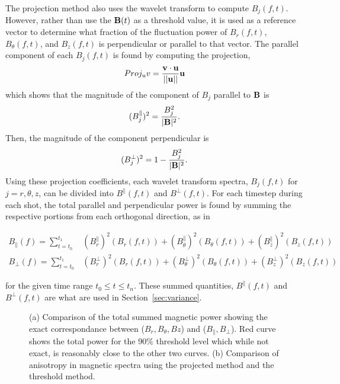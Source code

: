 \documentclass[preprint2]{aastex}
\begin{document}
The projection method also uses the wavelet transform to compute $B_{j}(f,t)$. However, rather than use the ${\bf B}(t)$ as a threshold value, it is used as a reference vector to determine what fraction of the fluctuation power of $B_{r}(f,t)$, $B_{\theta}(f,t)$, and $B_{z}(f,t)$ is perpendicular or parallel to that vector. The parallel component of each $B_{j}(f,t)$ is found by computing the projection,
\begin{equation}
Proj_{u}v = \frac{{\bf v} \cdot {\bf u}}{||{\bf u}||}{\bf u}
\label{eq:projection}
\end{equation}
which shows that the magnitude of the component of $B_{j}$ parallel to ${\bf B}$ is
\begin{equation}
(B_{j}^{\parallel})^{2} = \frac{B^{2}_{j}}{|{\bf B}|^{2}}.
\label{eq:para_mag}
\end{equation}
Then, the magnitude of the component perpendicular is
\begin{equation}
(B_{j}^{\perp})^2 = 1 - \frac{B^{2}_{j}}{|{\bf B}|^{2}}.
\label{eq:perp_mag}
\end{equation}
Using these projection coefficients, each wavelet transform spectra, $B_{j}(f,t)$ for $j = r,\theta,z$, can be divided into $B^{\parallel}(f,t)$ and $B^{\perp}(f,t)$. For each timestep during each shot, the total parallel and perpendicular power is found by summing the respective portions from each orthogonal direction, as in
\begin{mathletters}
\begin{eqnarray}
B_{\parallel}(f) = \sum_{t=t_{0}}^{t_{1}} &(B_{r}^{\parallel})^{2}(B_{r}(f,t))+(B_{\theta}^{\parallel})^{2}(B_{\theta}(f,t))+(B_{z}^{\parallel})^{2}(B_{z}(f,t))\\
B_{\perp}(f) = \sum_{t=t_{0}}^{t_{1}} &(B_{r}^{\perp})^{2}(B_{r}(f,t))+(B_{\theta}^{\perp})^{2}(B_{\theta}(f,t))+(B_{z}^{\perp})^{2}(B_{z}(f,t))
\label{eq:Bperp}
\end{eqnarray}
\end{mathletters}
for the given time range $t_{0}\leq t \leq t_{n}$. These summed quantities, $B^{\parallel}(f,t)$ and $B^{\perp}(f,t)$ are what are used in Section~\ref{sec:variance}.

\begin{figure}
\caption{\label{fig:powercomparison} (a) Comparison of the total summed magnetic power showing the exact correspondance between ($B_{r},B_{\theta},B{z}$) and ($B_{\parallel},B_{\perp}$). Red curve shows the total power for the 90$\%$ threshold level which while not exact, is reasonably close to the other two curves. (b) Comparison of anisotropy in magnetic spectra using the projected method and the threshold method.}
\end{figure}
\end{document}
